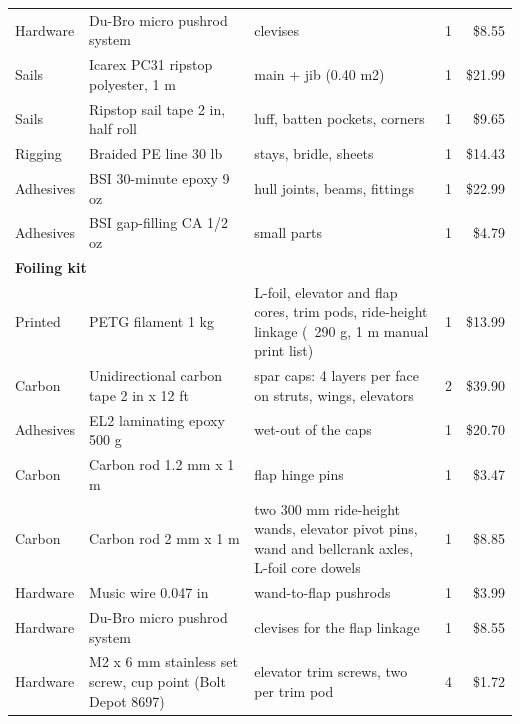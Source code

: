 \documentclass[11pt]{article}
\begin{document}
{\begin{longtable}{p{1.6cm}p{4.4cm}p{6.6cm}cr}
Hardware & Du-Bro micro pushrod system & clevises & 1 & \$8.55 \\
Sails & Icarex PC31 ripstop polyester, 1 m & main + jib (0.40 m2) & 1 & \$21.99 \\
Sails & Ripstop sail tape 2 in, half roll & luff, batten pockets, corners & 1 & \$9.65 \\
Rigging & Braided PE line 30 lb & stays, bridle, sheets & 1 & \$14.43 \\
Adhesives & BSI 30-minute epoxy 9 oz & hull joints, beams, fittings & 1 & \$22.99 \\
Adhesives & BSI gap-filling CA 1/2 oz & small parts & 1 & \$4.79 \\
\midrule
\multicolumn{5}{l}{\textbf{Foiling kit}}\\
Printed & PETG filament 1 kg & L-foil, elevator and flap cores, trim pods, ride-height linkage (~290 g, 1 m manual print list) & 1 & \$13.99 \\
Carbon & Unidirectional carbon tape 2 in x 12 ft & spar caps: 4 layers per face on struts, wings, elevators & 2 & \$39.90 \\
Adhesives & EL2 laminating epoxy 500 g & wet-out of the caps & 1 & \$20.70 \\
Carbon & Carbon rod 1.2 mm x 1 m & flap hinge pins & 1 & \$3.47 \\
Carbon & Carbon rod 2 mm x 1 m & two 300 mm ride-height wands, elevator pivot pins, wand and bellcrank axles, L-foil core dowels & 1 & \$8.85 \\
Hardware & Music wire 0.047 in & wand-to-flap pushrods & 1 & \$3.99 \\
Hardware & Du-Bro micro pushrod system & clevises for the flap linkage & 1 & \$8.55 \\
Hardware & M2 x 6 mm stainless set screw, cup point (Bolt Depot 8697) & elevator trim screws, two per trim pod & 4 & \$1.72 \\
\bottomrule
\end{longtable}}
\end{document}
